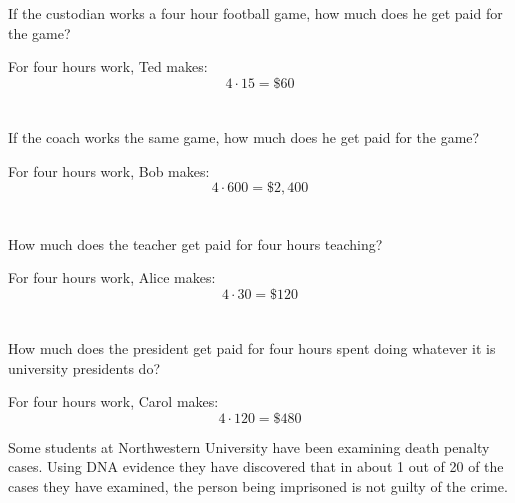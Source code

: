 \documentclass[letterpaper, landscape]{exam}
\begin{document}
\begin{questions}
\begin{solution}
    \end{solution}

    \begin{parts}
      \part{}
        If the custodian works a four hour football game, how much does he get
        paid for the game?
        \begin{solution}
          For four hours work, Ted makes:
          \[
            4 \cdot 15 = \$60
          \]
        \end{solution}

      \part{} If the coach works the same game, how much does he get paid for
      the game?
        \begin{solution}
            For four hours work, Bob makes:
            \[
              4 \cdot 600 = \$2,400
            \]
        \end{solution}

      \part{} How much does the teacher get paid for four hours teaching?
        \begin{solution}
            For four hours work, Alice makes: 
            \[
              4 \cdot 30 = \$120
            \]
        \end{solution}

      \part{} How much does the president get paid for four hours spent doing
        whatever it is university presidents do?

        \begin{solution}
            For four hours work, Carol makes:
            \[
              4 \cdot 120 = \$480
            \]
        \end{solution}

    \end{parts}

    \question{}
      Some students at Northwestern University have been examining death
      penalty cases.  Using DNA evidence they have discovered that in about 1
      out of 20 of the cases they have examined, the person being imprisoned
      is not guilty of the crime.  


\end{questions}
\end{document}
